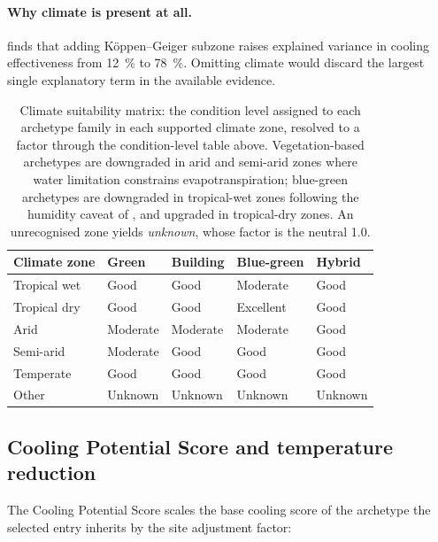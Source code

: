 \paragraph{Why climate is present at all.} \textcite{keravec2026} finds that
adding K\"oppen--Geiger subzone raises explained variance in cooling
effectiveness from \SI{12}{\percent} to \SI{78}{\percent}. Omitting climate
would discard the largest single explanatory term in the available evidence.

\begin{table}[htbp]
\centering
\caption[Climate suitability matrix]{Climate suitability matrix: the condition
level assigned to each archetype family in each supported climate zone, resolved
to a factor through the condition-level table above. Vegetation-based
archetypes are downgraded in arid and semi-arid zones where water limitation
constrains evapotranspiration; blue-green archetypes are downgraded in
tropical-wet zones following the humidity caveat of
\textcite{gunawardena2017}, and upgraded in tropical-dry zones. An
unrecognised zone yields \emph{unknown}, whose factor is the neutral 1.0.}
\label{tab:climate-matrix}
\small
\begin{tabular}{@{}lllll@{}}
\toprule
\textbf{Climate zone} & \textbf{Green} & \textbf{Building} &
\textbf{Blue-green} & \textbf{Hybrid} \\
\midrule
Tropical wet & Good     & Good     & Moderate  & Good \\
Tropical dry & Good     & Good     & Excellent & Good \\
Arid         & Moderate & Moderate & Moderate  & Good \\
Semi-arid    & Moderate & Good     & Good      & Good \\
Temperate    & Good     & Good     & Good      & Good \\
Other        & Unknown  & Unknown  & Unknown   & Unknown \\
\bottomrule
\end{tabular}
\end{table}

\subsection{Cooling Potential Score and temperature reduction}
\label{sec:cooling}

The Cooling Potential Score scales the base cooling score of the archetype the
selected entry inherits by the site adjustment factor:


